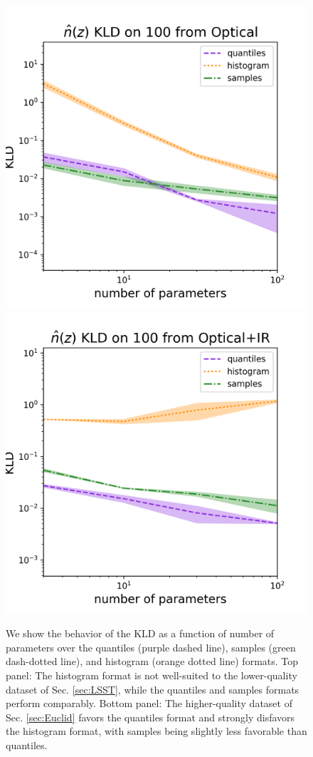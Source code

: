 \documentclass[\docopts]{\docclass}
\begin{document}
\begin{figure}
  \includegraphics[width=0.9\columnwidth]{figures/lsst_kld.png}\\
  \includegraphics[width=0.9\columnwidth]{figures/euclid_kld.png}
  \caption{We show the behavior of the KLD as a function of number of
parameters over the quantiles (purple dashed line), samples (green dash-dotted
line), and histogram (orange dotted line) formats.  Top panel: The histogram
format is not well-suited to the lower-quality dataset of Sec. \ref{sec:LSST},
while the quantiles and samples formats perform comparably.  Bottom panel: The
higher-quality dataset of Sec. \ref{sec:Euclid} favors the quantiles format and
strongly disfavors the histogram format, with samples being slightly less
favorable than quantiles.
  \label{fig:kld}}
\end{figure}
\end{document}
